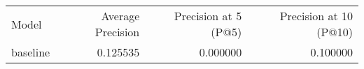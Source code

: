 \begin{tabular}{lrrr}
Model & Average Precision & Precision at 5 (P@5) & Precision at 10 (P@10) \\
baseline & 0.125535 & 0.000000 & 0.100000 \\
\end{tabular}
